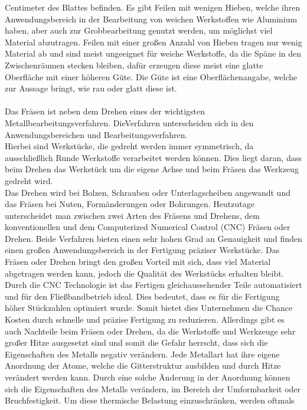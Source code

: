 Centimeter des Blattes befinden. Es gibt Feilen mit wenigen Hieben, welche ihren Anwendungsbereich in der Bearbeitung von weichen Werkstoffen wie 
Aluminium haben, aber auch zur Grobbearbeitung genutzt werden, um möglichst viel Material abzutragen. Feilen mit einer großen Anzahl von Hieben tragen
nur wenig Material ab und sind meist ungeeignet für weiche Werkstoffe, da die Späne in den Zwischenräumen stecken bleiben, dafür erzeugen diese meist eine 
glatte Oberfläche mit einer höheren Güte. Die Güte ist eine Oberflächenangabe, welche zur Aussage bringt, wie rau oder glatt diese ist. \autocite{Forster.2018}
\\\\
Das Fräsen ist neben dem Drehen eines der wichtigsten Metallbearbeitungsverfahren. DieVerfahren unterscheiden sich in den Anwendungsbereichen und 
Bearbeitungsverfahren. 
\\
Hierbei sind Werkstücke, die gedreht werden immer symmetrisch, da ausschließlich Runde Werkstoffe verarbeitet werden können. Dies liegt daran, dass beim 
Drehen das Werkstück um die eigene Achse und beim Fräsen das Werkzeug gedreht wird. 
\\
Das Drehen wird \zB bei Bolzen, Schrauben oder Unterlagscheiben angewandt und das Fräsen bei \zB Nuten, Formänderungen oder Bohrungen. Heutzutage unterscheidet
man zwischen zwei Arten des Fräsens und Drehens, dem konventionellen und dem Computerized Numerical Control (CNC) Fräsen oder Drehen. Beide Verfahren bieten
einen sehr hohen Grad an Genauigkeit und finden einen großen Anwendungsbereich in der Fertigung präziser Werkstücke. Das Fräsen oder Drehen bringt den 
großen Vorteil mit sich, dass viel Material abgetragen werden kann, jedoch die Qualität des Werkstücks erhalten bleibt. Durch die CNC Technologie ist das 
Fertigen gleichaussehender Teile automatisiert und für den Fließbandbetrieb ideal. Dies bedeutet, dass es für die Fertigung höher Stückzahlen optimiert 
wurde. Somit bietet dies Unternehmen die Chance Kosten durch schnelle und präzise Fertigung zu reduzieren. Allerdings gibt es auch Nachteile beim Fräsen 
oder Drehen, da die Werkstoffe und Werkzeuge sehr großer Hitze ausgesetzt sind und somit die Gefahr
herrscht, dass sich die Eigenschaften \zB des Metalls negativ verändern. Jede Metallart hat ihre eigene Anordnung der
Atome, welche die Gitterstruktur ausbilden und durch Hitze verändert werden kann. Durch eine solche Änderung in der Anordnung können sich die 
Eigenschaften des Metalls verändern, \zB im Bereich der Umformbarkeit oder Bruchfestigkeit. Um diese thermische Belastung einzuschränken, werden oftmals 
